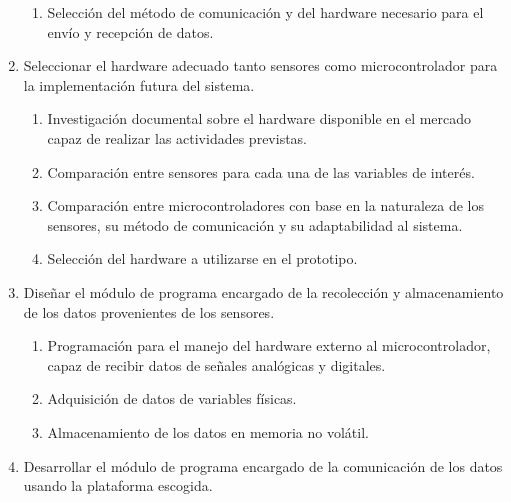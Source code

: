 \documentclass[12pt,letterpaper]{article}
\begin{document}
\begin{enumerate}[1.]
\begin{enumerate}
		      \item Selección del método de comunicación y del hardware necesario para el envío y recepción de datos.

	      \end{enumerate}


	\item Seleccionar el hardware adecuado tanto sensores como microcontrolador para la implementación futura del sistema.


	      \begin{enumerate}

			\item Investigación documental sobre el hardware disponible en el mercado capaz de realizar las actividades previstas.

			\item Comparación entre sensores para cada una de las variables de interés.

			\item Comparación entre microcontroladores con base en la naturaleza de los sensores, su método de comunicación y su adaptabilidad al sistema.
			
		 	\item Selección del hardware a utilizarse en el prototipo.

	      \end{enumerate}

	\item Diseñar el módulo de programa encargado de la recolección y almacenamiento de los datos provenientes de los sensores.


	      \begin{enumerate}
			
			\item Programación para el manejo del hardware externo al microcontrolador, capaz de recibir datos de señales analógicas y digitales.
			\item Adquisición de datos de variables físicas.
			\item Almacenamiento de los datos en memoria no volátil.

	      \end{enumerate}



	\item Desarrollar el módulo de programa encargado de la comunicación de los datos usando la plataforma escogida.


	      \begin{enumerate}


\end{enumerate}
\end{enumerate}
\end{document}
